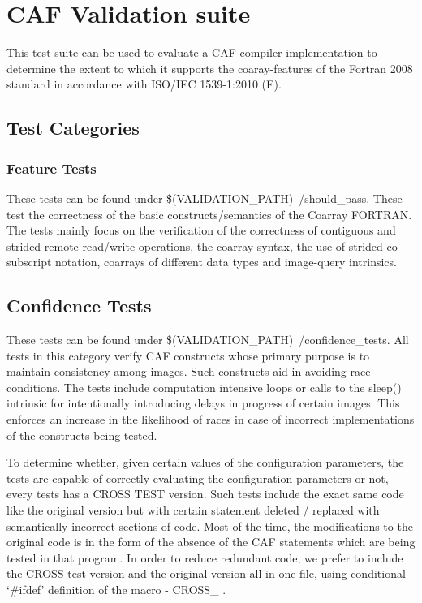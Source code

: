 \section{CAF Validation suite}
This test suite can be used to evaluate a CAF compiler
implementation to determine the extent to which it supports the
coaray-features of the Fortran 2008 standard in accordance with
ISO/IEC 1539-1:2010 (E)\cite{ftn2008}.


\subsection{Test Categories}

\subsubsection{Feature Tests}

These tests can be found under \$(VALIDATION\_PATH)~/should\_pass.
These test the correctness of the basic constructs/semantics
of the Coarray FORTRAN. The tests mainly focus on the
verification of the correctness of contiguous and strided remote
read/write operations, the coarray syntax, the use of strided
co-subscript notation, coarrays of different data types and
image-query intrinsics.


\subsection{Confidence Tests}
These tests can be found under
\$(VALIDATION\_PATH)~/confidence\_tests. All tests in this
category verify CAF constructs whose primary purpose is to
maintain consistency among images. Such constructs aid in
avoiding race conditions. The tests include computation
intensive loops or calls to the sleep() intrinsic for
intentionally introducing delays in progress of certain images.
This enforces an increase in the likelihood of races in case of
incorrect implementations of the constructs being tested.

To determine whether, given certain values of the configuration
parameters, the tests are capable of correctly evaluating the
configuration parameters or not, every tests has a CROSS TEST
version. Such tests include the exact same code like the
original version but with certain statement deleted / replaced
with semantically incorrect sections of code. Most of the time,
the modifications to the original code is in the form of the
absence of the CAF statements which are being tested in that
program. In order to reduce redundant code, we prefer to include
the CROSS test version and the original version all in one file,
using conditional `\#ifdef' definition of the macro - CROSS\_ .

